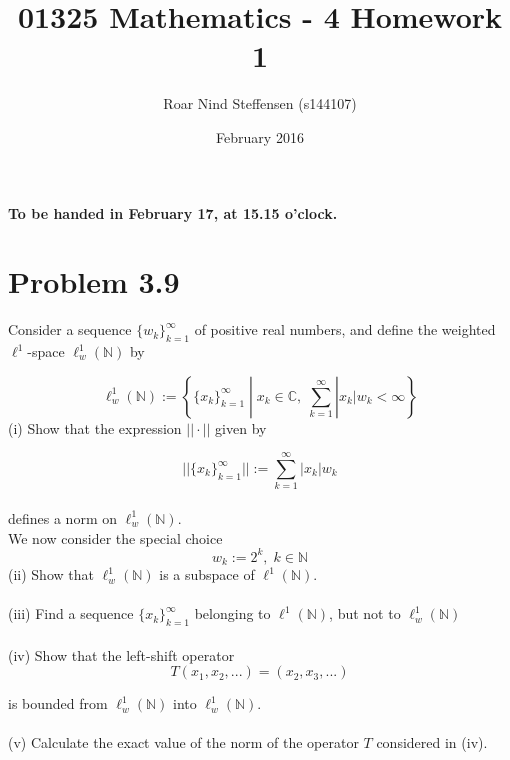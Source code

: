 \documentclass{article}
\title{01325 Mathematics - 4 Homework 1}
\author{Roar Nind Steffensen (s144107)}
\date{February 2016}
\begin{document}
\maketitle

\begin{center}
\textbf{ To be handed in February 17, at 15.15 o'clock.}
\end{center}
 \vspace{5mm}
 
\section*{Problem 3.9}

Consider a sequence $\{w_k\}_{k=1}^\infty$ of positive real numbers, and define the weighted $\ell^1$-space $\ell_w^1 \left(\mathbb{N}\right)$ by

\begin{equation*}
    \ell_w^1(\mathbb{N}) := \left \{ \{x_k\}_{k=1}^\infty \;| \; x_k \in \mathbb{C}, \; \sum_{k=1}^\infty |x_k|w_k < \infty \right \}
\end{equation*}
(i) Show that the expression $|| \cdot ||$ given by

\begin{equation*}
    ||\{x_k\}_{k=1}^\infty||:= \sum_{k=1}^\infty |x_k|w_k
\end{equation*}\\

defines a norm on $\ell_w^1(\mathbb{N})$.\\
We now consider the special choice
\begin{equation*}
    w_k := 2^k,\; k\in \mathbb{N}
\end{equation*}
(ii) Show that $\ell_w^1(\mathbb{N})$ is a subspace of $\ell^1(\mathbb{N})$.\\
\\
(iii) Find a sequence $\{x_k\}_{k=1}^\infty$ belonging to $\ell^1(\mathbb{N})$, but not to $\ell_w^1(\mathbb{N})$\\
\\
(iv) Show that the left-shift operator 
\begin{equation*}
    T(x_1,x_2,...)=(x_2,x_3,...)
\end{equation*}

is bounded from $\ell_w^1(\mathbb{N})$ into $\ell_w^1(\mathbb{N})$.\\
\\
(v) Calculate the exact value of the norm of the operator $T$ considered in (iv).
\end{document}

